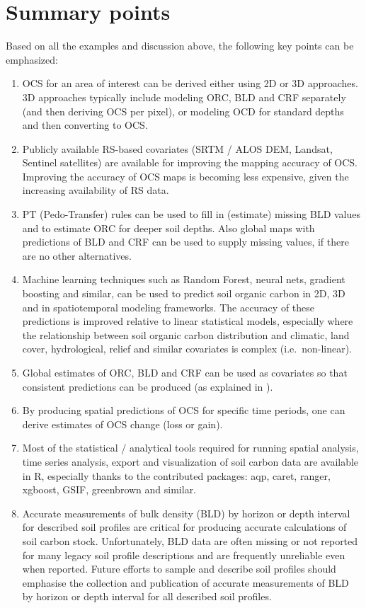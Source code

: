 \documentclass[graybox,natbib,nospthms,UStrade]{svmono}
\providecommand{\tightlist}{%
  \setlength{\itemsep}{0pt}\setlength{\parskip}{0pt}}
\providecommand{\tightlist}{\setlength{\itemsep}{0pt}\setlength{\parskip}{0pt}}
\begin{document}
\hypertarget{summary-points-4}{%
\section{Summary points}\label{summary-points-4}}

Based on all the examples and discussion above, the following key points can be emphasized:

\begin{enumerate}
\def\labelenumi{\arabic{enumi}.}
\tightlist
\item
  OCS for an area of interest can be derived either using 2D or 3D approaches. 3D approaches typically include modeling ORC, BLD and CRF separately (and then deriving OCS per pixel), or modeling OCD for standard depths and then converting to OCS.
\item
  Publicly available RS-based covariates (SRTM / ALOS DEM, Landsat, Sentinel satellites) are available for improving the mapping accuracy of OCS. Improving the accuracy of OCS maps is becoming less expensive, given the increasing availability of RS data.
\item
  PT (Pedo-Transfer) rules can be used to fill in (estimate) missing BLD values and to estimate ORC for deeper soil depths. Also global maps with predictions of BLD and CRF can be used to supply missing values, if there are no other alternatives.
\item
  Machine learning techniques such as Random Forest, neural nets, gradient boosting and similar, can be used to predict soil organic carbon in 2D, 3D and in spatiotemporal modeling frameworks. The accuracy of these predictions is improved relative to linear statistical models, especially where the relationship between soil organic carbon distribution and climatic, land cover, hydrological, relief and similar covariates is complex (i.e.~non-linear).
\item
  Global estimates of ORC, BLD and CRF can be used as covariates so that consistent predictions can be produced (as explained in \citet{ramcharan2018soil}).
\item
  By producing spatial predictions of OCS for specific time periods, one can derive estimates of OCS change (loss or gain).
\item
  Most of the statistical / analytical tools required for running spatial analysis, time series analysis, export and visualization of soil carbon data are available in R, especially thanks to the contributed packages: aqp, caret, ranger, xgboost, GSIF, greenbrown and similar.
\item
  Accurate measurements of bulk density (BLD) by horizon or depth interval for described soil profiles are critical for producing accurate calculations of soil carbon stock. Unfortunately, BLD data are often missing or not reported for many legacy soil profile descriptions and are frequently unreliable even when reported. Future efforts to sample and describe soil profiles should emphasise the collection and publication of accurate measurements of BLD by horizon or depth interval for all described soil profiles.
\end{enumerate}
\end{document}
